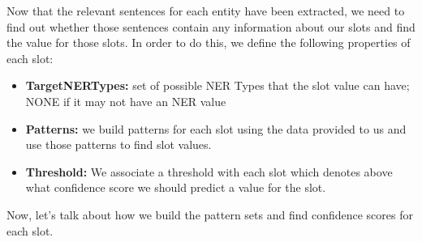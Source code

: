 Now that the relevant sentences for each entity have been extracted, we need to find out whether those sentences contain any information about our slots and find the value for those slots. In order to do this, we define the following properties of each slot:
\begin{itemize}
\item \textbf{TargetNERTypes:} set of possible NER Types that the slot value can have; NONE if it may not have an NER value
\item \textbf{Patterns:} we build patterns for each slot using the data provided to us and use those patterns to find slot values. 
\item \textbf{Threshold:} We associate a threshold with each slot which denotes above what confidence score we should predict a value for the slot.
\end{itemize}

Now, let’s talk about how we build the pattern sets and find confidence scores for each slot.
